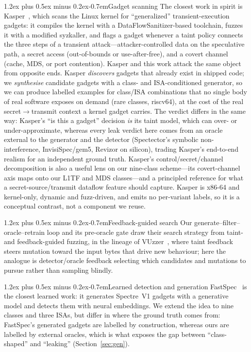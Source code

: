 \documentclass[conference]{IEEEtran}
\makeatletter
\renewcommand\paragraph{\@startsection{paragraph}{4}{\z@}%
  {1.2ex plus 0.5ex minus 0.2ex}{-0.7em}{\normalfont\normalsize\bfseries}}
\makeatother
\begin{document}
\paragraph{Gadget scanning}
The closest work in spirit is Kasper~\cite{kasper}, which scans the Linux
kernel for ``generalized'' transient-execution gadgets: it compiles the kernel
with a DataFlowSanitizer-based toolchain, fuzzes it with a modified syzkaller,
and flags a gadget whenever a taint policy connects the three steps of a
transient attack---attacker-controlled data on the speculative path, a secret
access (out-of-bounds or use-after-free), and a covert channel (cache, MDS, or
port contention). Kasper and this work attack the same object from opposite
ends. Kasper \emph{discovers} gadgets that already exist in shipped code;
we \emph{synthesise} candidate gadgets with a class- and ISA-conditioned
generator, so we can produce labelled examples for class/ISA combinations that
no single body of real software exposes on demand (rare classes, riscv64),
at the cost of the real secret$\to$transmit context a kernel gadget carries.
The verdict differs in the same way: Kasper's ``is this a gadget'' decision
\emph{is} its taint model, which can over- or under-approximate, whereas every
leak verdict here comes from an oracle external to the generator and the
detector (Spectector's symbolic non-interference, InvisiSpec/gem5, Revizor on
silicon), trading Kasper's end-to-end realism for an independent ground truth.
Kasper's control/secret/channel decomposition is also a useful lens on our
nine-class scheme---its covert-channel axis maps onto our L1TF and MDS
classes---and a principled reference for what a secret-source/transmit dataflow
feature should capture. Kasper is x86-64 and kernel-only, dynamic and
fuzz-driven, and emits no per-variant labels, so it is a conceptual contrast,
not a component we reuse.

\paragraph{Feedback-guided search} Our generate--filter--oracle--retrain
loop and its pre-oracle gate draw their search strategy from taint- and
feedback-guided fuzzing, in the lineage of VUzzer~\cite{vuzzer}, where taint
feedback steers mutation toward the input bytes that drive new behaviour; here
the analogue is detector/oracle feedback selecting which candidates and
mutations to pursue rather than sampling blindly.

\paragraph{Learned detection and generation} FastSpec~\cite{fastspec} is the
closest learned work: it generates Spectre~V1 gadgets with a generative model
and detects them with neural embeddings. We extend the idea to nine classes and
three ISAs, but differ in where the ground truth comes from: FastSpec's
generated gadgets are labelled by construction, whereas ours are labelled by
external oracles, which is what exposes the gap between ``class-shaped'' and
``leaking'' (Section~\ref{sec:gen}).
\end{document}
